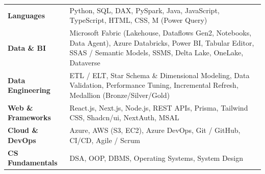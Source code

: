 \documentclass[10pt,letterpaper]{article}
\begin{document}
\begin{tabularx}{\linewidth}{@{}l@{\hspace{12pt}}X@{}}
\textbf{Languages}            & Python, SQL, DAX, PySpark, Java, JavaScript, TypeScript, HTML, CSS, M (Power Query) \\
\textbf{Data \& BI}           & Microsoft Fabric (Lakehouse, Dataflows Gen2, Notebooks, Data Agent), Azure Databricks, Power BI, Tabular Editor, SSAS / Semantic Models, SSMS, Delta Lake, OneLake, Dataverse \\
\textbf{Data Engineering}     & ETL / ELT, Star Schema \& Dimensional Modeling, Data Validation, Performance Tuning, Incremental Refresh, Medallion (Bronze/Silver/Gold) \\
\textbf{Web \& Frameworks}    & React.js, Next.js, Node.js, REST APIs, Prisma, Tailwind CSS, Shadcn/ui, NextAuth, MSAL \\
\textbf{Cloud \& DevOps}      & Azure, AWS (S3, EC2), Azure DevOps, Git / GitHub, CI/CD, Agile / Scrum \\
\textbf{CS Fundamentals}      & DSA, OOP, DBMS, Operating Systems, System Design \\
\end{tabularx}

\vspace{-0.1cm}
\end{document}
